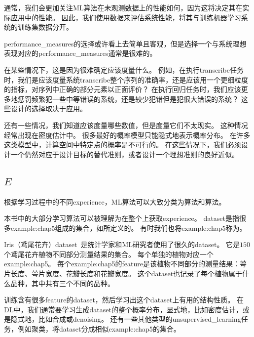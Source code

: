 
通常，我们会更加关注\gls{ML}算法在未观测数据上的性能如何，因为这将决定其在实际应用中的性能。
因此，我们使用数据来评估系统性能，将其与训练机器学习系统的训练集数据分开。


\gls{performance_measures}的选择或许看上去简单且客观，但是选择一个与系统理想表现对应的\gls{performance_measures}通常是很难的。


在某些情况下，这是因为很难确定应该度量什么。
例如，在执行\gls{transcribe}任务时，我们是应该度量系统\gls{transcribe}整个序列的准确率，还是应该用一个更细粒度的指标，对序列中正确的部分元素以正面评价？
在执行回归任务时，我们应该更多地惩罚频繁犯一些中等错误的系统，还是较少犯错但是犯很大错误的系统？
这些设计的选择取决于应用。


还有一些情况，我们知道应该度量哪些数值，但是度量它们不太现实。
这种情况经常出现在密度估计中。
很多最好的概率模型只能隐式地表示概率分布。
在许多这类模型中，计算空间中特定点的概率是不可行的。
在这些情况下，我们必须设计一个仍然对应于设计目标的替代准则，或者设计一个理想准则的良好近似。

\subsection{ $E$}
\label{sec:the_experience_e}
根据学习过程中的不同\gls{experience}，\gls{ML}算法可以大致分类为算法和算法。

本书中的大部分学习算法可以被理解为在整个上获取\gls{experience}。
\gls{dataset}是指很多\gls{example:chap5}组成的集合，如所定义的。
有时我们也将\gls{example:chap5}称为。


Iris（鸢尾花卉）\gls{dataset}~\citep{Fisher-1936}是统计学家和\gls{ML}研究者使用了很久的\gls{dataset}。
它是$150$个鸢尾花卉植物不同部分测量结果的集合。
每个单独的植物对应一个\gls{example:chap5}。
每个\gls{example:chap5}的\gls{feature}是该植物不同部分的测量结果：萼片长度、萼片宽度、花瓣长度和花瓣宽度。
这个\gls{dataset}也记录了每个植物属于什么品种，其中共有三个不同的品种。

训练含有很多\gls{feature}的\gls{dataset}，然后学习出这个\gls{dataset}上有用的结构性质。
在\gls{DL}中，我们通常要学习生成\gls{dataset}的整个概率分布，显式地，比如密度估计，或是隐式地，比如合成或\gls{denoising}。
还有一些其他类型的\gls{unsupervised_learning}任务，例如聚类，将\gls{dataset}分成相似\gls{example:chap5}的集合。

